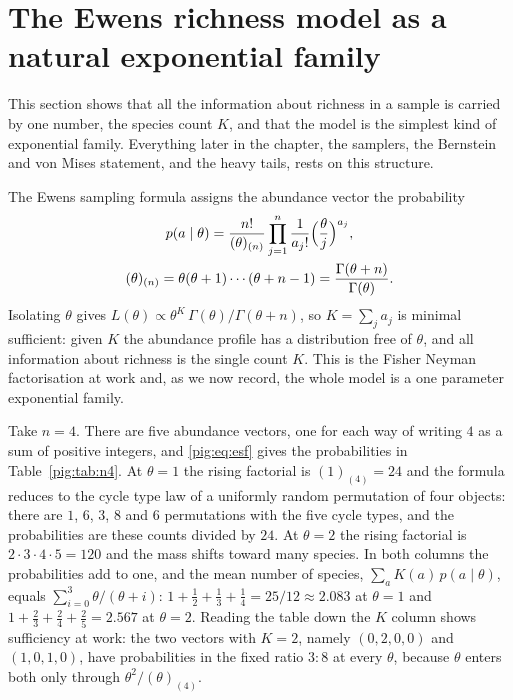 \section{The Ewens richness model as a natural exponential family}\label{pig:sec:nef}

This section shows that all the information about richness in a sample is carried by one number, the species count $K$, and that the model is the simplest kind of exponential family. Everything later in the chapter, the samplers, the Bernstein and von Mises statement, and the heavy tails, rests on this structure.

The Ewens sampling formula assigns the abundance vector the probability
\begin{equation}\label{pig:eq:esf}
\begin{gathered}
p(a\mid\theta)=\frac{n!}{(\theta)_{(n)}}\prod_{j=1}^{n}\frac{1}{a_j!}\Bigl(\frac{\theta}{j}\Bigr)^{a_j},\\
(\theta)_{(n)}=\theta(\theta+1)\cdots(\theta+n-1)=\frac{\Gamma(\theta+n)}{\Gamma(\theta)}.
\end{gathered}
\end{equation}
Isolating $\theta$ gives $L(\theta)\propto\theta^K\,\Gamma(\theta)/\Gamma(\theta+n)$, so $K=\sum_j a_j$ is minimal sufficient: given $K$ the abundance profile has a distribution free of $\theta$, and all information about richness is the single count $K$. This is the Fisher Neyman factorisation at work and, as we now record, the whole model is a one parameter exponential family.

\begin{example}\label{pig:ex:n4}
Take $n=4$. There are five abundance vectors, one for each way of writing $4$ as a sum of positive integers, and \eqref{pig:eq:esf} gives the probabilities in Table~\ref{pig:tab:n4}. At $\theta=1$ the rising factorial is $(1)_{(4)}=24$ and the formula reduces to the cycle type law of a uniformly random permutation of four objects: there are $1$, $6$, $3$, $8$ and $6$ permutations with the five cycle types, and the probabilities are these counts divided by $24$. At $\theta=2$ the rising factorial is $2\cdot3\cdot4\cdot5=120$ and the mass shifts toward many species. In both columns the probabilities add to one, and the mean number of species, $\sum_a K(a)\,p(a\mid\theta)$, equals $\sum_{i=0}^{3}\theta/(\theta+i)$: $1+\tfrac12+\tfrac13+\tfrac14=25/12\approx2.083$ at $\theta=1$ and $1+\tfrac23+\tfrac24+\tfrac25=2.567$ at $\theta=2$. Reading the table down the $K$ column shows sufficiency at work: the two vectors with $K=2$, namely $(0,2,0,0)$ and $(1,0,1,0)$, have probabilities in the fixed ratio $3:8$ at every $\theta$, because $\theta$ enters both only through $\theta^2/(\theta)_{(4)}$.
\end{example}

